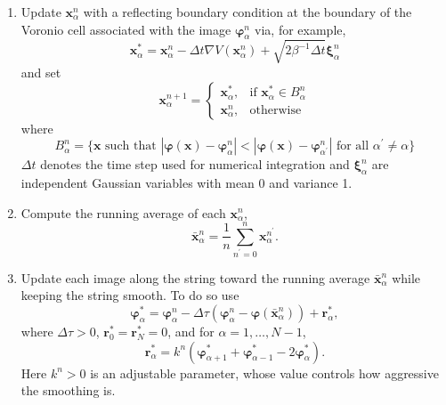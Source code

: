 \begin{enumerate}
	\item Update $\mathbf{x}_\alpha^n$ with a reflecting boundary condition at the boundary of the Voronio cell associated with the image $\boldsymbol{\varphi}_\alpha^n$ via, for example,
	\begin{equation}
	    \mathbf{x}^\ast_\alpha=\mathbf{x}_\alpha^n-\Delta t\nabla V(\mathbf{x}_\alpha^n)+\sqrt{2\beta^{-1}\Delta t}\boldsymbol{\xi}_\alpha^n
	\end{equation}
	and set
	\begin{equation}
	    \mathbf{x}_\alpha^{n+1}=\begin{cases}
	        \mathbf{x}_\alpha^\ast,&\text{if } \mathbf{x}_\alpha^\ast\in B_\alpha^n\\
	        \mathbf{x}_\alpha^n,&\text{otherwise }
	    \end{cases}
	\end{equation}
	where
	\begin{equation}
	    B_\alpha^n=\{\mathbf{x} \text{ such that }|\boldsymbol{\varphi}(\mathbf{x})-\boldsymbol{\varphi}_\alpha^n|<|\boldsymbol{\varphi}(\mathbf{x})-\boldsymbol{\varphi}_{\alpha^\prime}^n| \text{ for all }\alpha^\prime\neq \alpha\}
	\end{equation}
	$\Delta t$ denotes the time step used for numerical integration and $\boldsymbol{\xi}_\alpha^n$ are independent Gaussian variables with mean 0 and variance 1.
	
	\item Compute the running average of each $\mathbf{x}_\alpha^n$,
	\begin{equation}
	    \bar{\mathbf{x}}_\alpha^n=\frac{1}{n}\sum_{n^\prime=0}^{n}\mathbf{x}_\alpha^{n^\prime}.
	\end{equation}
	
	\item Update each image along the string toward the running average $\bar{\mathbf{x}}_\alpha^n$ while keeping the string smooth. To do so use
	\begin{equation}
	    \boldsymbol{\varphi}_{\alpha}^\ast=\boldsymbol{\varphi}_{\alpha}^n-\Delta \tau(\boldsymbol{\varphi}_{\alpha}^n-\boldsymbol{\varphi}(\bar{\mathbf{x}}_\alpha^n))+\mathbf{r}_\alpha^\ast,
	\end{equation}
	where $\Delta \tau>0$, $\mathbf{r}_0^\ast=\mathbf{r}_N^\ast=0$, and for $\alpha=1,\dots,N-1$,
	\begin{equation}
	    \mathbf{r}_\alpha^\ast=k^n(\boldsymbol{\varphi}_{\alpha+1}^\ast+\boldsymbol{\varphi}_{\alpha-1}^\ast-2\boldsymbol{\varphi}_{\alpha}^\ast).
	\end{equation}
	Here $k^n>0$ is an adjustable parameter, whose value controls how aggressive the smoothing is.
	

\end{enumerate}
